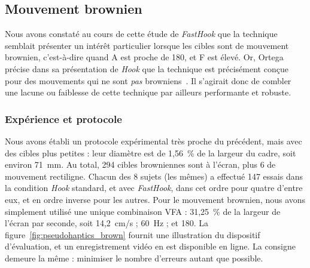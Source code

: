 	\subsection{Mouvement brownien}
	\label{sub:fastHookBrown}
	Nous avons constaté au cours de cette étude de \emph{FastHook} que la technique semblait présenter un intérêt particulier lorsque les cibles sont de mouvement brownien, c'est-à-dire quand A est proche de 180\textdegree{}, et F est élevé. Or, Ortega précise dans sa présentation de \emph{Hook} que la technique est précisément conçue pour des mouvements qui ne sont \emph{pas} browniens~\cite{ortega2013hook}. Il s'agirait donc de combler une lacune ou faiblesse de cette technique par ailleurs performante et robuste.
	
	\subsubsection{Expérience et protocole}
	Nous avons établi un protocole expérimental très proche du précédent, mais avec des cibles plus petites : leur diamètre est de 1,56~\%{} de la largeur du cadre, soit environ 71~mm. Au total, 294 cibles browniennes sont à l'écran, plus 6 de mouvement rectiligne. Chacun des 8 sujets (les mêmes) a effectué 147 essais dans la condition \emph{Hook} standard, et avec \emph{FastHook}, dans cet ordre pour quatre d'entre eux, et en ordre inverse pour les autres. Pour le mouvement brownien, nous avons simplement utilisé une unique combinaison VFA : 31,25~\%{} de la largeur de l'écran par seconde, soit 14,2~cm/s ; 60~Hz ; et 180\textdegree{}. La figure~\ref{fig:pseudohaptics_brown} fournit une illustration du dispositif d'évaluation, et un enregistrement vidéo en est disponible en ligne.\footnotemark{} La consigne demeure la même : minimiser le nombre d'erreurs autant que possible.
	
	

	
